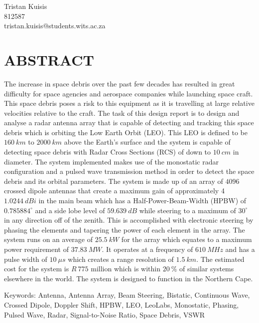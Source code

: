 \documentclass[11pt]{witseiepaper}
\begin{document}
\begin{bibunit}[witseie]
\begin{center}
\vspace{2cm}
{\Large Tristan Kuisis} \\
{\small 812587} \\
{\small tristan.kuisis@students.wits.ac.za}
\end{center}

\section*{ABSTRACT}
The increase in space debris over the past few decades has resulted in great difficulty for space agencies and aerospace companies while launching space craft. This space debris poses a risk to this equipment as it is travelling at large relative velocities relative to the craft.
The task of this design report is to design and analyse a radar antenna array that is capable of detecting and tracking this space debris which is orbiting the Low Earth Orbit (LEO). This LEO is defined to be $160~km$ to $2000~km$ above the Earth's surface and the system is capable of detecting space debris with Radar Cross Sections (RCS) of down to $10~cm$ in diameter.
The system implemented makes use of the monostatic radar configuration and a pulsed wave transmission method in order to detect the space debris and its orbital parameters.
The system is made up of an array of $4096$ crossed dipole antennas that create a maximum gain of approximately 4$1.0244~dBi$ in the main beam which has a Half-Power-Beam-Width (HPBW) of $0.785884^{\circ}$ and a side lobe level of $59.639~dB$ while steering to a maximum of $30^{\circ}$ in any direction off of the zenith. This is accomplished with electronic steering by phasing the elements and tapering the power of each element in the array.
The system runs on an average of $25.5~kW$ for the array which equates to a maximum power requirement of $37.83~MW$. It operates at a frequency of $610~MHz$ and has a pulse width of $10~\mu s$ which creates a range resolution of $1.5~km$.
The estimated cost for the system is $R~775$ million which is within $20~\%$ of similar systems elsewhere in the world. The system is designed to function in the Northern Cape.

Keywords:  Antenna, Antenna Array, Beam Steering, Bistatic, Continuous Wave, Crossed Dipole, Doppler Shift, HPBW, LEO, LeoLabs, Monostatic, Phasing, Pulsed Wave, Radar, Signal-to-Noise Ratio, Space Debris, VSWR
\clearpage


\clearpage


\end{bibunit}
\end{document}
